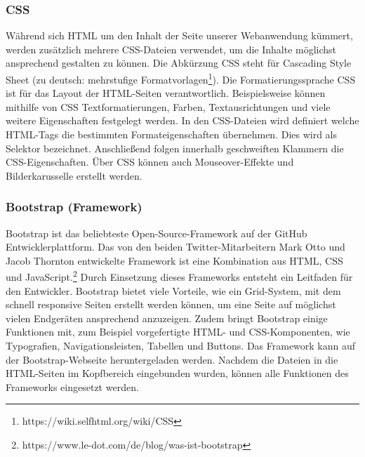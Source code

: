 	    \subsubsection{CSS}
	    Während sich \ac{HTML} um den Inhalt der Seite unserer Webanwendung kümmert, werden zusätzlich mehrere \acs{CSS}-Dateien verwendet, um die Inhalte möglichst ansprechend gestalten zu können. Die Abkürzung \acs{CSS} steht für Cascading Style Sheet (zu deutsch: mehrstufige Formatvorlagen\footnote{https://wiki.selfhtml.org/wiki/CSS}). Die Formatierungssprache \acs{CSS} ist für das Layout der HTML-Seiten verantwortlich. Beispielsweise können mithilfe von \acs{CSS} Textformatierungen, Farben, Textausrichtungen und viele weitere Eigenschaften festgelegt werden. In den \acs{CSS}-Dateien wird definiert welche HTML-Tags die bestimmten Formateigenschaften übernehmen. Dies wird als Selektor bezeichnet. Anschließend folgen innerhalb geschweiften Klammern die \acs{CSS}-Eigenschaften. Über \acs{CSS} können auch Mouseover-Effekte und Bilderkarusselle erstellt werden.  
	    
	    \subsubsection{Bootstrap (Framework)}
	    Bootstrap ist das beliebteste Open-Source-Framework auf der GitHub Entwicklerplattform.  Das von den beiden Twitter-Mitarbeitern Mark Otto und Jacob Thornton entwickelte Framework ist eine Kombination aus HTML, \acs{CSS} und JavaScript.\footnote{https://www.le-dot.com/de/blog/was-ist-bootstrap} Durch Einsetzung dieses Frameworks entsteht ein Leitfaden für den Entwickler. Bootstrap bietet viele Vorteile, wie ein Grid-System, mit dem schnell responsive Seiten erstellt werden können, um eine Seite auf möglichst vielen Endgeräten ansprechend anzuzeigen. Zudem bringt Bootstrap einige Funktionen mit, zum Beispiel vorgefertigte HTML- und \acs{CSS}-Komponenten, wie Typografien, Navigationsleisten, Tabellen und Buttons. Das Framework kann auf der Bootstrap-Webseite heruntergeladen werden. Nachdem die Dateien in die HTML-Seiten im Kopfbereich eingebunden wurden, können alle Funktionen des Frameworks eingesetzt werden.
	    
